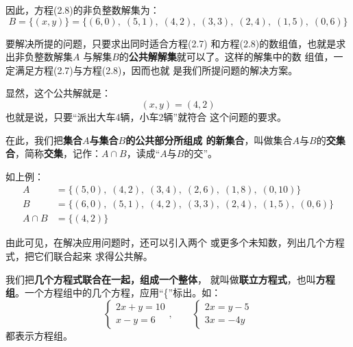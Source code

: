 因此，方程(2.8)的非负整数解集为：
\[B=\{(x,y)\} =\{(6,0),\; (5,  1),\; 
      (4, 2),\; (3,  3),\; (2,   4),\; 
      (1,5),\; (0,6)\} \]

要解决所提的问题，只要求出同时适合方程(2.7)
和方程(2.8)的数组值，也就是求出非负整数解集$A$
与解集$B$的\textbf{公共解解集}就可以了。这样的解集中的数
组值，一定满足方程(2.7)与方程(2.8)，因而也就
是我们所提问题的解决方案。

显然，这个公共解就是：
          \[(x,y)=(4, 2)\]
也就是说，只要“派出大车4辆，小车2辆”就符合
这个问题的要求。

    在此，我们把\textbf{集合$A$与集合$B$的公共部分所组成
的新集合}，叫做集合$A$与$B$的\textbf{交集合}，简称\textbf{交集}，记作：$A\cap B$，读成“$A$与$B$的交”。

    如上例：
\[\begin{split}
    A&=\{(5,  0),\; (4, 2),\; (3,  4),\;  (2,  6),\; (1,  8),\; (0,  10)\} \\
B&=\{(6,  0),\; (5,  1),\; (4,  2),\; (3,  3),\; (2,  4),\; (1, 5),\;     (0,  6)\}\\
A\cap B&=\{(4,  2)\}
\end{split}  \]

\begin{figure}[htp]
\begin{center}
\end{center}
    \caption{}
\end{figure}

由此可见，在解决应用问题时，还可以引入两个
或更多个未知数，列出几个方程式，把它们联合起来
求得公共解。

    我们把\textbf{几个方程式联合在一起，组成一个整体}，
就叫做\textbf{联立方程式}，也叫\textbf{方程组}。一个方程组中的几个方程，应用“\{”标出。如：
\[\begin{cases}
   2x+y=10\\
   x-y=6 
\end{cases},\qquad \begin{cases}
    2x=y-5\\
    3x=-4y
\end{cases}\]    
都表示方程组。

